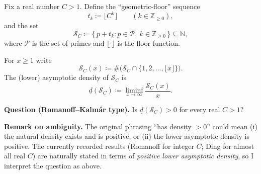 Fix a real number $C>1$. Define the ``geometric-floor'' sequence
\[
 t_k \coloneqq \lfloor C^k\rfloor\qquad (k\in\mathbb{Z}_{\ge 0}),
\]
and the set
\[
\mathcal{S}_C \coloneqq \{\, p + t_k : p\in\mathcal{P},\ k\in\mathbb{Z}_{\ge 0}\,\}\subseteq\mathbb{N},
\]
where $\mathcal{P}$ is the set of primes and $\lfloor\cdot\rfloor$ is the floor function.

For $x\ge 1$ write
\[
\mathcal{S}_C(x) \coloneqq \#\bigl(\mathcal{S}_C\cap\{1,2,\dots,\lfloor x\rfloor\}\bigr).
\]
The (lower) asymptotic density of $\mathcal{S}_C$ is
\[
\underline{d}(\mathcal{S}_C) \coloneqq \liminf_{x\to\infty} \frac{\mathcal{S}_C(x)}{x}.
\]

\noindent\textbf{Question (Romanoff--Kalm\'ar type).} Is $\underline{d}(\mathcal{S}_C)>0$ for every real $C>1$?

\medskip
\noindent\textbf{Remark on ambiguity.} The original phrasing ``has density $>0$'' could mean (i) the natural density exists and is positive, or (ii) the lower asymptotic density is positive. The currently recorded results (Romanoff for integer $C$; Ding for almost all real $C$) are naturally stated in terms of \emph{positive lower asymptotic density}, so I interpret the question as above.
